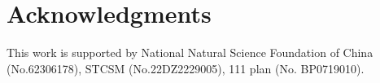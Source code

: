 \section*{Acknowledgments}
This work is supported by National Natural Science Foundation of China (No.62306178), STCSM (No.22DZ2229005), 111 plan (No. BP0719010).